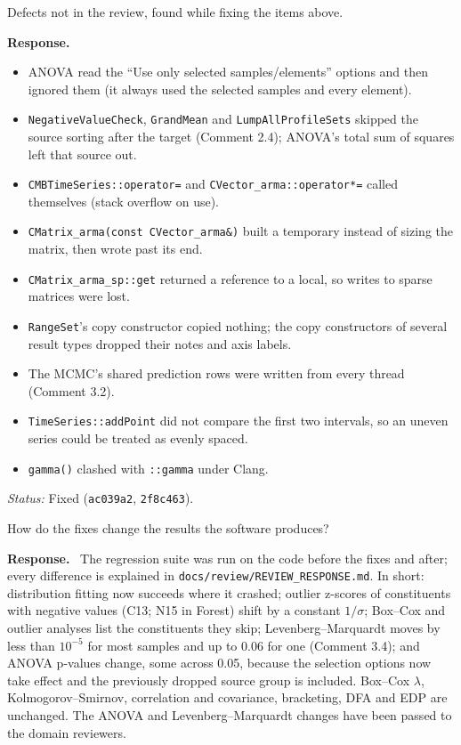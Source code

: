 \documentclass[11pt]{article}
\newcommand{\code}[1]{\texttt{#1}}
\newcommand{\commit}[1]{\texttt{#1}}
\newcounter{cmt}
\newcounter{grp}
\renewcommand{\thecmt}{\thegrp.\arabic{cmt}}
\newenvironment{reviewer}[1]{%
  \refstepcounter{cmt}%
  \begin{tcolorbox}[enhanced,breakable,colback=commentbg,colframe=usgsgreen!60,
    boxrule=0.4pt,left=6pt,right=6pt,top=4pt,bottom=4pt,
    title={\small\textbf{Comment \thecmt}\hfill\textit{#1}},
    coltitle=black,colbacktitle=usgsgreen!15,fonttitle=\small]}%
  {\end{tcolorbox}}
\newenvironment{response}{\par\noindent\textbf{Response.}\ }{\par\medskip}
\newcommand{\status}[1]{\par\noindent\textit{Status:} #1\par}
\begin{document}
\begin{reviewer}{Found while addressing the review}
Defects not in the review, found while fixing the items above.
\end{reviewer}
\begin{response}
\begin{itemize}[nosep,leftmargin=*]
\item ANOVA read the ``Use only selected samples/elements'' options and then
  ignored them (it always used the selected samples and every element).
\item \code{NegativeValueCheck}, \code{GrandMean} and \code{LumpAllProfileSets}
  skipped the source sorting after the target (Comment 2.4); ANOVA's total sum
  of squares left that source out.
\item \code{CMBTimeSeries::\allowbreak{}operator=} and \code{CVector\_\allowbreak{}arma::\allowbreak{}operator*=}
  called themselves (stack overflow on use).
\item \code{CMatrix\_\allowbreak{}arma(const CVector\_\allowbreak{}arma\&)} built a temporary instead of
  sizing the matrix, then wrote past its end.
\item \code{CMatrix\_\allowbreak{}arma\_\allowbreak{}sp::\allowbreak{}get} returned a reference to a local, so writes
  to sparse matrices were lost.
\item \code{RangeSet}'s copy constructor copied nothing; the copy constructors
  of several result types dropped their notes and axis labels.
\item The MCMC's shared prediction rows were written from every thread
  (Comment 3.2).
\item \code{TimeSeries::\allowbreak{}addPoint} did not compare the first two intervals,
  so an uneven series could be treated as evenly spaced.
\item \code{gamma()} clashed with \code{::\allowbreak{}gamma} under Clang.
\end{itemize}
\end{response}
\status{Fixed (\commit{ac039a2}, \commit{2f8c463}).}

\begin{reviewer}{Effect on results}
How do the fixes change the results the software produces?
\end{reviewer}
\begin{response}
The regression suite was run on the code before the fixes and after; every
difference is explained in \code{docs/\allowbreak{}review/\allowbreak{}REVIEW\_\allowbreak{}RESPONSE.\allowbreak{}md}. In short:
distribution fitting now succeeds where it crashed; outlier z-scores of
constituents with negative values (C13; N15 in Forest) shift by a constant
$1/\sigma$; Box--Cox and outlier analyses list the constituents they skip;
Levenberg--Marquardt moves by less than $10^{-5}$ for most samples and up to
0.06 for one (Comment 3.4); and ANOVA p-values change, some across 0.05,
because the selection options now take effect and the previously dropped
source group is included. Box--Cox $\lambda$, Kolmogorov--Smirnov,
correlation and covariance, bracketing, DFA and EDP are unchanged. The ANOVA
and Levenberg--Marquardt changes have been passed to the domain reviewers.
\end{response}
\end{document}
